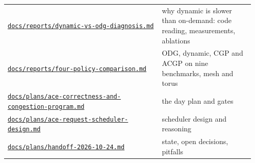{\begin{longtable}{@{}p{0.60\linewidth}p{0.36\linewidth}@{}}
\href{https://github.com/sanjeevkrishnaa/Compiler-Driven-ACE/blob/codex/ace-scheduler-correctness/docs/reports/dynamic-vs-odg-diagnosis.md}{\nolinkurl{docs/reports/dynamic-vs-odg-diagnosis.md}} & why dynamic is slower than on-demand: code reading, measurements, ablations \\
\href{https://github.com/sanjeevkrishnaa/Compiler-Driven-ACE/blob/codex/ace-scheduler-correctness/docs/reports/four-policy-comparison.md}{\nolinkurl{docs/reports/four-policy-comparison.md}} & ODG, dynamic, CGP and ACGP on nine benchmarks, mesh and torus \\
\href{https://github.com/sanjeevkrishnaa/Compiler-Driven-ACE/blob/codex/ace-scheduler-correctness/docs/plans/ace-correctness-and-congestion-program.md}{\nolinkurl{docs/plans/ace-correctness-and-congestion-program.md}} & the day plan and gates \\
\href{https://github.com/sanjeevkrishnaa/Compiler-Driven-ACE/blob/codex/ace-scheduler-correctness/docs/plans/ace-request-scheduler-design.md}{\nolinkurl{docs/plans/ace-request-scheduler-design.md}} & scheduler design and reasoning \\
\href{https://github.com/sanjeevkrishnaa/Compiler-Driven-ACE/blob/codex/ace-scheduler-correctness/docs/plans/handoff-2026-10-24.md}{\nolinkurl{docs/plans/handoff-2026-10-24.md}} & state, open decisions, pitfalls \\
\end{longtable}
}
